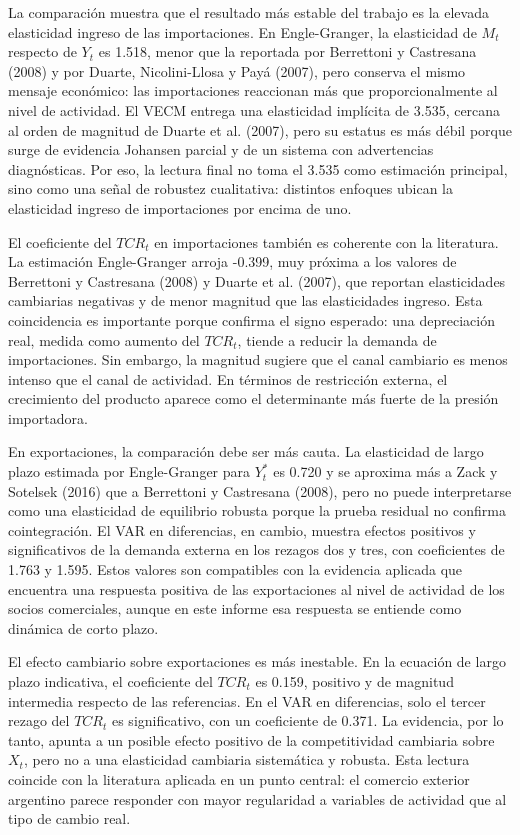 \documentclass[11pt,a4paper]{article}
\begin{document}
	La comparación muestra que el resultado más estable del trabajo es la elevada
	elasticidad ingreso de las importaciones. En Engle-Granger, la elasticidad de
	\(M_t\) respecto de \(Y_t\) es 1.518, menor que la reportada por Berrettoni y
	Castresana (2008) y por Duarte, Nicolini-Llosa y Payá (2007), pero conserva el
	mismo mensaje económico: las importaciones reaccionan más que
	proporcionalmente al nivel de actividad. El VECM entrega una elasticidad
	implícita de 3.535, cercana al orden de magnitud de Duarte et al. (2007), pero
	su estatus es más débil porque surge de evidencia Johansen parcial y de un
	sistema con advertencias diagnósticas. Por eso, la lectura final no toma el
	3.535 como estimación principal, sino como una señal de robustez cualitativa:
	distintos enfoques ubican la elasticidad ingreso de importaciones por encima de
	uno.
	
	El coeficiente del \(TCR_t\) en importaciones también es coherente con la
	literatura. La estimación Engle-Granger arroja -0.399, muy próxima a los valores
	de Berrettoni y Castresana (2008) y Duarte et al. (2007), que reportan
	elasticidades cambiarias negativas y de menor magnitud que las elasticidades
	ingreso. Esta coincidencia es importante porque confirma el signo esperado:
	una depreciación real, medida como aumento del \(TCR_t\), tiende a reducir la
	demanda de importaciones. Sin embargo, la magnitud sugiere que el canal
	cambiario es menos intenso que el canal de actividad. En términos de
	restricción externa, el crecimiento del producto aparece como el determinante
	más fuerte de la presión importadora.
	
	En exportaciones, la comparación debe ser más cauta. La elasticidad de largo
	plazo estimada por Engle-Granger para \(Y_t^*\) es 0.720 y se aproxima más a
	Zack y Sotelsek (2016) que a Berrettoni y Castresana (2008), pero no puede
	interpretarse como una elasticidad de equilibrio robusta porque la prueba
	residual no confirma cointegración. El VAR en diferencias, en cambio, muestra
	efectos positivos y significativos de la demanda externa en los rezagos dos y
	tres, con coeficientes de 1.763 y 1.595. Estos valores son compatibles con la
	evidencia aplicada que encuentra una respuesta positiva de las exportaciones al
	nivel de actividad de los socios comerciales, aunque en este informe esa
	respuesta se entiende como dinámica de corto plazo.
	
	El efecto cambiario sobre exportaciones es más inestable. En la ecuación de
	largo plazo indicativa, el coeficiente del \(TCR_t\) es 0.159, positivo y de
	magnitud intermedia respecto de las referencias. En el VAR en diferencias, solo
	el tercer rezago del \(TCR_t\) es significativo, con un coeficiente de 0.371.
	La evidencia, por lo tanto, apunta a un posible efecto positivo de la
	competitividad cambiaria sobre \(X_t\), pero no a una elasticidad cambiaria
	sistemática y robusta. Esta lectura coincide con la literatura aplicada en un
	punto central: el comercio exterior argentino parece responder con mayor
	regularidad a variables de actividad que al tipo de cambio real.
	
\end{document}
